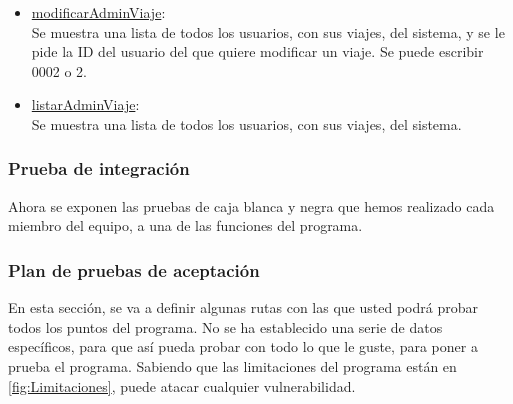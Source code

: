 \begin{itemize}
  \item \href{DOC_DOXYGEN/modificar_8c_source.html}{modificarAdminViaje}:\\
  Se muestra una lista de todos los usuarios, con sus viajes, del sistema, y se le pide la ID del usuario del que quiere modificar un viaje. Se puede escribir 0002 o 2.

  \item \href{DOC_DOXYGEN/listar_8c_source.html}{listarAdminViaje}:\\
  Se muestra una lista de todos los usuarios, con sus viajes, del sistema.
\end{itemize}

\subsubsection{Prueba de integración}

Ahora se exponen las pruebas de caja blanca y negra que hemos realizado cada miembro del equipo, a una de las funciones del programa.







\subsubsection{Plan de pruebas de aceptación}

En esta sección, se va a definir algunas rutas con las que usted podrá probar todos los puntos del programa. No se ha establecido una serie de datos específicos, para que así pueda probar con
todo lo que le guste, para poner a prueba el programa. Sabiendo que las limitaciones del programa están en \ref{fig:Limitaciones}, puede atacar cualquier vulnerabilidad.

\bigskip

